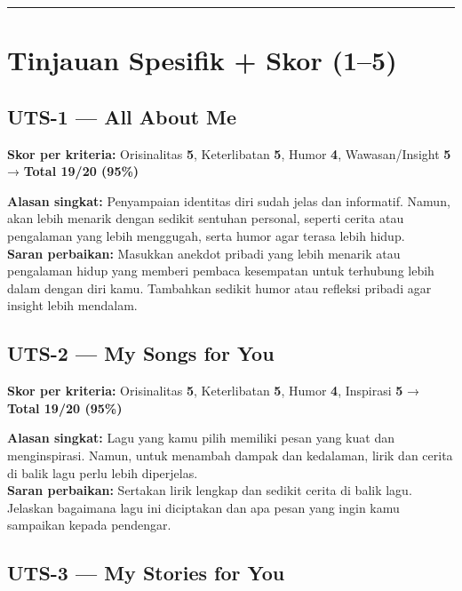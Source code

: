 \documentclass[
  letterpaper,
  DIV=11,
  numbers=noendperiod]{scrreprt}
\begin{document}
\begin{center}\rule{0.5\linewidth}{0.5pt}\end{center}

\section{Tinjauan Spesifik + Skor
(1--5)}\label{tinjauan-spesifik-skor-15}

\subsection{UTS-1 --- All About Me}\label{uts-1-all-about-me-1}

\textbf{Skor per kriteria:} Orisinalitas \textbf{5}, Keterlibatan
\textbf{5}, Humor \textbf{4}, Wawasan/Insight \textbf{5} → \textbf{Total
19/20 (95\%)}

\textbf{Alasan singkat:} Penyampaian identitas diri sudah jelas dan
informatif. Namun, akan lebih menarik dengan sedikit sentuhan personal,
seperti cerita atau pengalaman yang lebih menggugah, serta humor agar
terasa lebih hidup.\\
\textbf{Saran perbaikan:} Masukkan anekdot pribadi yang lebih menarik
atau pengalaman hidup yang memberi pembaca kesempatan untuk terhubung
lebih dalam dengan diri kamu. Tambahkan sedikit humor atau refleksi
pribadi agar insight lebih mendalam.

\subsection{UTS-2 --- My Songs for You}\label{uts-2-my-songs-for-you-1}

\textbf{Skor per kriteria:} Orisinalitas \textbf{5}, Keterlibatan
\textbf{5}, Humor \textbf{4}, Inspirasi \textbf{5} → \textbf{Total 19/20
(95\%)}

\textbf{Alasan singkat:} Lagu yang kamu pilih memiliki pesan yang kuat
dan menginspirasi. Namun, untuk menambah dampak dan kedalaman, lirik dan
cerita di balik lagu perlu lebih diperjelas.\\
\textbf{Saran perbaikan:} Sertakan lirik lengkap dan sedikit cerita di
balik lagu. Jelaskan bagaimana lagu ini diciptakan dan apa pesan yang
ingin kamu sampaikan kepada pendengar.

\subsection{UTS-3 --- My Stories for
You}\label{uts-3-my-stories-for-you-1}
\end{document}
